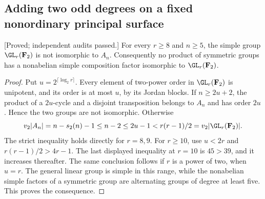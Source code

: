 \subsection{Adding two odd degrees on a fixed nonordinary principal surface}
\label{subsec:nonordinary-even-addition-candidate}

\begin{lemma}
\label{lem:nonordinary-addition-simple-group-separation-candidate}
\textup{[Proved; independent audits passed.]}
For every $r\ge8$ and $n\ge5$, the simple group
$\GL_r(\mathbf F_2)$ is not isomorphic to $A_n$.
Consequently no product of symmetric groups has a nonabelian
simple composition factor isomorphic to $\GL_r(\mathbf F_2)$.
\end{lemma}
\begin{proof}
Put $u=2^{\lceil\log_2 r\rceil}$. Every element of two-power
order in $\GL_r(\mathbf F_2)$ is unipotent, and its order is at
most $u$, by its Jordan blocks. If $n\ge2u+2$, the product of
a $2u$-cycle and a disjoint transposition belongs to $A_n$ and
has order $2u$. Hence the two groups are not isomorphic.
Otherwise
\[
       v_2|A_n|=n-s_2(n)-1\le n-2\le2u-1
                           < r(r-1)/2=v_2|\GL_r(\mathbf F_2)|.
\]
The strict inequality holds directly for $r=8,9$. For $r\ge10$,
use $u<2r$ and $r(r-1)/2>4r-1$. The last displayed inequality
at $r=10$ is $45>39$, and it increases thereafter. The same
conclusion follows if $r$ is a power of two, when $u=r$.
The general linear group is simple in this range, while the
nonabelian simple factors of a symmetric group are alternating
groups of degree at least five. This proves the consequence.
\end{proof}

